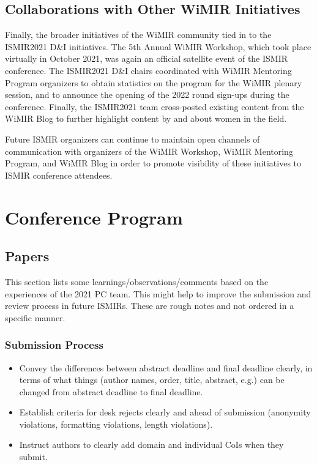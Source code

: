 \documentclass[%
10pt,								%
titlepage,						%
]
{scrartcl}
\begin{document}
    \subsection{Collaborations with Other WiMIR Initiatives}
        Finally, the broader initiatives of the WiMIR community tied in to the ISMIR2021 D\&I initiatives. The 5th Annual WiMIR Workshop, which took place virtually in October 2021, was again an official satellite event of the ISMIR conference. The ISMIR2021 D\&I chairs coordinated with WiMIR Mentoring Program organizers to obtain statistics on the program for the WiMIR plenary session, and to announce the opening of the 2022 round sign-ups during the conference. Finally, the ISMIR2021 team cross-posted existing content from the WiMIR Blog to further highlight content by and about women in the field. 

        Future ISMIR organizers can continue to maintain open channels of communication with organizers of the WiMIR Workshop, WiMIR Mentoring Program, and WiMIR Blog in order to promote visibility of these initiatives to ISMIR conference attendees.

    
\section{Conference Program}
    \subsection{Papers}
        This section lists some learnings/observations/comments based on the experiences of the 2021 PC team. This might help to improve the submission and review process in future ISMIRs. These are rough notes and not ordered in a specific manner.
        
        \subsubsection{Submission Process}
            \begin{itemize}
                \item Convey the differences between abstract deadline and final deadline clearly, in terms of what things (author names, order, title, abstract, e.g.) can be changed from abstract deadline to final deadline.
                \item   Establish criteria for desk rejects clearly and ahead of submission (anonymity violations, formatting violations, length violations).
                \item   Instruct authors to clearly add domain and individual CoIs when they submit.
            \end{itemize}
        
\end{document}
